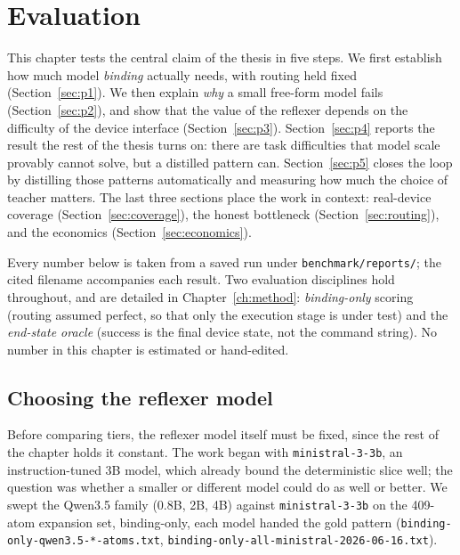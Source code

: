 \chapter{Evaluation}
\label{ch:eval}

This chapter tests the central claim of the thesis in five steps. We first
establish how much model \emph{binding} actually needs, with routing held fixed
(Section~\ref{sec:p1}). We then explain \emph{why} a small free-form model fails
(Section~\ref{sec:p2}), and show that the value of the reflexer depends on the
difficulty of the device interface (Section~\ref{sec:p3}). Section~\ref{sec:p4}
reports the result the rest of the thesis turns on: there are task difficulties
that model scale provably cannot solve, but a distilled pattern can.
Section~\ref{sec:p5} closes the loop by distilling those patterns automatically
and measuring how much the choice of teacher matters. The last three sections
place the work in context: real-device coverage (Section~\ref{sec:coverage}),
the honest bottleneck (Section~\ref{sec:routing}), and the economics
(Section~\ref{sec:economics}).

Every number below is taken from a saved run under \texttt{benchmark/reports/};
the cited filename accompanies each result. Two evaluation disciplines hold
throughout, and are detailed in Chapter~\ref{ch:method}: \emph{binding-only}
scoring (routing assumed perfect, so that only the execution stage is under test)
and the \emph{end-state oracle} (success is the final device state, not the
command string). No number in this chapter is estimated or hand-edited.

\section{Choosing the reflexer model}
\label{sec:p0}

Before comparing tiers, the reflexer model itself must be fixed, since the rest of
the chapter holds it constant. The work began with \texttt{ministral-3-3b}, an
instruction-tuned 3B model, which already bound the deterministic slice well; the
question was whether a smaller or different model could do as well or better. We
swept the Qwen3.5 family (0.8B, 2B, 4B) against \texttt{ministral-3-3b} on the
409-atom expansion set, binding-only, each model handed the gold pattern
(\texttt{binding-only-qwen3.5-*-atoms.txt}, \texttt{binding-only-all-ministral-2026-06-16.txt}).

